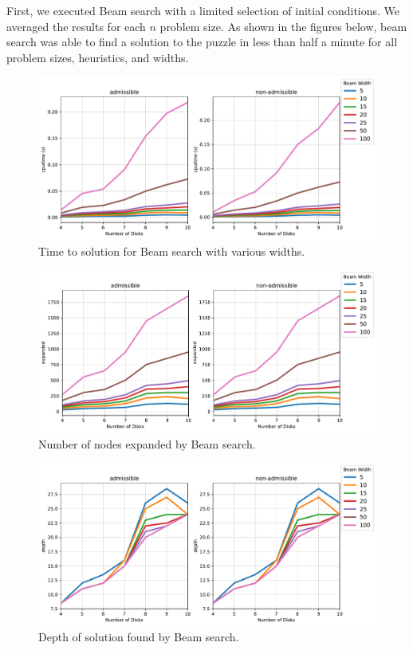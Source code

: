 \documentclass[12pt]{article}
\begin{document}
First, we executed Beam search with a limited selection of initial conditions.  
We averaged the results for each $n$ problem size.
As shown in the figures below, beam search was able to find a solution to the puzzle in less than half a minute for all problem sizes, heuristics, and widths.

\begin{figure}[H]
	\centering
    \includegraphics[width=\textwidth]{BeamTestCputime}
	\caption{Time to solution for Beam search with various widths.}	
	\label{f:BeamCpu}
\end{figure}
\begin{figure}[H]
	\centering
    \includegraphics[width=\textwidth]{BeamTestExpanded}
	\caption{Number of nodes expanded by Beam search.}
	\label{f:BeamEx}
\end{figure}
\begin{figure}[H]
	\centering
    \includegraphics[width=\textwidth]{BeamTestDepth}
	\caption{Depth of solution found by Beam search.}
	\label{f:BeamDepth}	
\end{figure}
\end{document}
